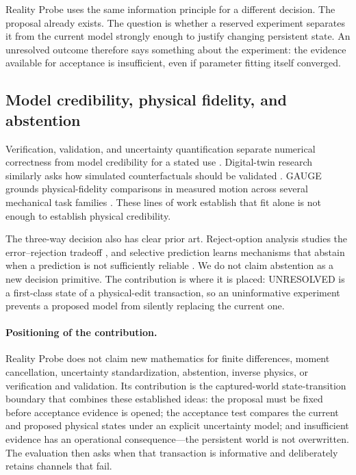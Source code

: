 \documentclass[acmtog]{acmart}
\begin{document}
Reality Probe uses the same information principle for a different decision. The proposal already exists. The question is whether a reserved experiment separates it from the current model strongly enough to justify changing persistent state. An unresolved outcome therefore says something about the experiment: the evidence available for acceptance is insufficient, even if parameter fitting itself converged.

\subsection{Model credibility, physical fidelity, and abstention}\label{simulation-credibility-and-measured-physical-fidelity}

Verification, validation, and uncertainty quantification separate numerical correctness from model credibility for a stated use \citep{oberkampf2007pcmm}. Digital-twin research similarly asks how simulated counterfactuals should be validated \citep{laudy2026digitaltwin}. GAUGE grounds physical-fidelity comparisons in measured motion across several mechanical task families \citep{wang2026gauge}. These lines of work establish that fit alone is not enough to establish physical credibility.

The three-way decision also has clear prior art. Reject-option analysis studies the error--rejection tradeoff \citep{chow1970reject}, and selective prediction learns mechanisms that abstain when a prediction is not sufficiently reliable \citep{geifman2019selectivenet}. We do not claim abstention as a new decision primitive. The contribution is where it is placed: UNRESOLVED is a first-class state of a physical-edit transaction, so an uninformative experiment prevents a proposed model from silently replacing the current one.

\paragraph{Positioning of the contribution.}
Reality Probe does not claim new mathematics for finite differences, moment cancellation, uncertainty standardization, abstention, inverse physics, or verification and validation. Its contribution is the captured-world state-transition boundary that combines these established ideas: the proposal must be fixed before acceptance evidence is opened; the acceptance test compares the current and proposed physical states under an explicit uncertainty model; and insufficient evidence has an operational consequence---the persistent world is not overwritten. The evaluation then asks when that transaction is informative and deliberately retains channels that fail.
\end{document}
